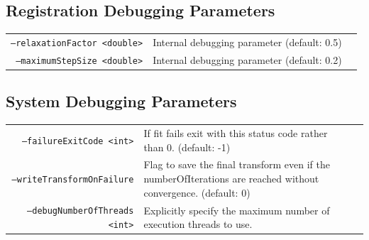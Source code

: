 \documentclass{InsightArticle}
\begin{document}
\subsection{Registration Debugging Parameters}
\begin{tabular}{rp{0.15in}l}
\vspace{0.15in}\par
\texttt{--relaxationFactor <double>} & \parbox[t]{3.5in}{Internal debugging parameter (default: 0.5)} \\
\vspace{0.15in}\par
\texttt{--maximumStepSize <double>} & \parbox[t]{3.5in}{Internal debugging parameter (default: 0.2)} \\
\end{tabular}
\subsection{System Debugging Parameters}
\begin{tabular}{rp{0.15in}l}
\vspace{0.15in}\par
\texttt{--failureExitCode <int>} & \parbox[t]{3.5in}{If fit fails exit with this status code rather than 0. (default: -1)} \\
\vspace{0.15in}\par
\texttt{--writeTransformOnFailure} & \parbox[t]{3.5in}{Flag to save the final transform even if the numberOfIterations are reached without convergence. (default: 0)} \\
\vspace{0.15in}\par
\texttt{--debugNumberOfThreads <int>} & \parbox[t]{3.5in}{Explicitly specify the maximum number of execution threads to use.} \\
\end{tabular}
\vspace{0.15in}\par
\end{document}
